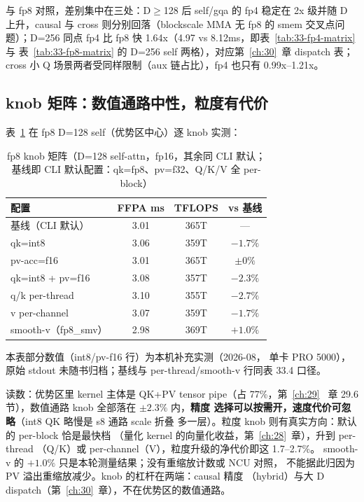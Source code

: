 与 fp8 对照，差别集中在三处：D$\ge$128 后 self/gqa 的 fp4 稳定在 2x 级并随 D
上升，causal 与 cross 则分别回落（blockscale MMA 无 fp8 的 smem 交叉点问题）；D=256 同点
fp4 比 fp8 快 1.64x（4.97 vs 8.12ms，即表~\ref{tab:33-fp4-matrix} 与
表~\ref{tab:33-fp8-matrix} 的 D=256 self 两格），对应第~\ref{ch:30}~章 dispatch
表；cross 小 Q 场景两者受同样限制（aux 链占比），fp4 也只有 0.99x--1.21x。

\subsection{knob 矩阵：数值通路中性，粒度有代价}

表~\ref{tab:33-knobs} 在 fp8 D=128 self（优势区中心）逐 knob 实测：

\begin{table}[htbp]
  \centering\small
  \caption{fp8 knob 矩阵（D=128 self-attn，fp16，其余同 CLI 默认；
  基线即 CLI 默认配置：qk=fp8、pv=f32、Q/K/V 全 per-block）}
  \label{tab:33-knobs}
  \begin{tabular}{lccc}
    \toprule
    配置 & FFPA ms & TFLOPS & vs 基线 \\
    \midrule
    基线（CLI 默认）           & 3.01 & 365T & --- \\
    \quad qk=int8               & 3.06 & 359T & $-1.7\%$ \\
    \quad pv-acc=f16            & 3.01 & 365T & $\pm0\%$ \\
    \quad qk=int8 + pv=f16      & 3.08 & 357T & $-2.3\%$ \\
    \quad q/k per-thread        & 3.10 & 355T & $-2.7\%$ \\
    \quad v per-channel         & 3.07 & 359T & $-1.7\%$ \\
    \quad smooth-v（fp8\_smv）  & 2.98 & 369T & $+1.0\%$ \\
    \bottomrule
  \end{tabular}

  \par\vspace{4pt}
  {\footnotesize 本表部分数值（int8/pv-f16 行）为本机补充实测（2026-08，
  单卡 PRO 5000），原始 stdout 未随书归档；基线与 per-thread/smooth-v
  行同表 33.4 口径。\par}
\end{table}

读数：优势区里 kernel 主体是 QK+PV tensor pipe（占 77\%，第~\ref{ch:29}~
章 29.6 节），数值通路 knob 全部落在 $\pm2.3\%$ 内，\textbf{精度
选择可以按需开，速度代价可忽略}（int8 QK 略慢是 s8 通路 scale 折叠
多一层）。粒度 knob 则有真实方向：默认的 per-block 恰是最快档
（量化 kernel 的向量化收益，第~\ref{ch:28}~章），升到 per-thread
（Q/K）或 per-channel（V），粒度升级的净代价即这 1.7--2.7\%。
smooth-v 的 $+1.0\%$ 只是本轮测量结果；没有重缩放计数或 NCU 对照，
不能据此归因为 PV 溢出重缩放减少。knob 的杠杆在两端：causal 精度
（hybrid）与大 D dispatch（第~\ref{ch:30}~章），不在优势区的数值通路。

